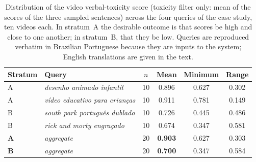 \begin{table}[!t]
\centering
\caption{Distribution of the video verbal-toxicity score (toxicity filter only: mean of the scores of the three sampled sentences) across the four queries of the case study, ten videos each. In stratum~A the desirable outcome is that scores be high and close to one another; in stratum~B, that they be low. Queries are reproduced verbatim in Brazilian Portuguese because they are inputs to the system; English translations are given in the text.}
\label{tab:estratos}
\begin{tabular}{llcccc}
\toprule
Stratum & Query & $n$ & Mean & Minimum & Range \\
\midrule
A & \emph{desenho animado infantil} & 10 & 0.896 & 0.627 & 0.302 \\
A & \emph{vídeo educativo para crianças} & 10 & 0.911 & 0.781 & 0.149 \\
B & \emph{south park português dublado} & 10 & 0.726 & 0.445 & 0.486 \\
B & \emph{rick and morty engraçado} & 10 & 0.674 & 0.347 & 0.581 \\
\midrule
\textbf{A} & \emph{aggregate} & 20 & \textbf{0.903} & 0.627 & 0.303 \\
\textbf{B} & \emph{aggregate} & 20 & \textbf{0.700} & 0.347 & 0.584 \\
\bottomrule
\end{tabular}
\end{table}
